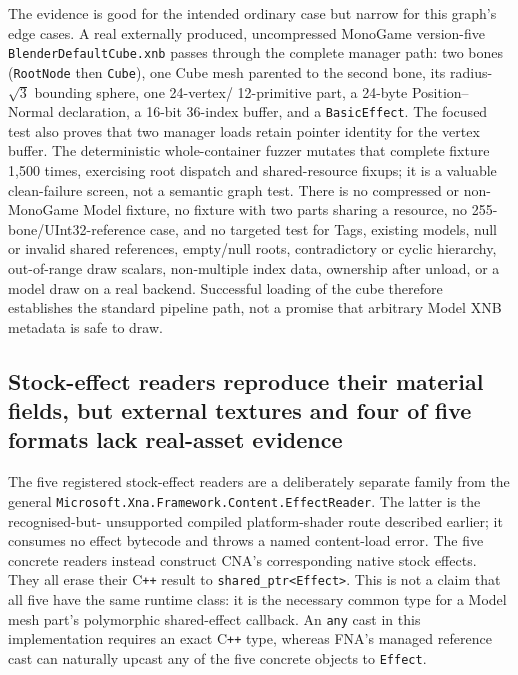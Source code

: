The evidence is good for the intended ordinary case but narrow for this graph's edge cases.  A
real externally produced, uncompressed MonoGame version-five \texttt{BlenderDefaultCube.xnb}
passes through the complete manager path: two bones (\texttt{RootNode} then \texttt{Cube}), one
Cube mesh parented to the second bone, its radius-$\sqrt{3}$ bounding sphere, one 24-vertex/
12-primitive part, a 24-byte Position--Normal declaration, a 16-bit 36-index buffer, and a
\texttt{BasicEffect}.  The focused test also proves that two manager loads retain pointer identity
for the vertex buffer.  The deterministic whole-container fuzzer mutates that complete fixture
1,500 times, exercising root dispatch and shared-resource fixups; it is a valuable clean-failure
screen, not a semantic graph test.  There is no compressed or non-MonoGame Model fixture, no
fixture with two parts sharing a resource, no 255-bone/UInt32-reference case, and no targeted
test for Tags, existing models, null or invalid shared references, empty/null roots, contradictory
or cyclic hierarchy, out-of-range draw scalars, non-multiple index data, ownership after unload,
or a model draw on a real backend.  Successful loading of the cube therefore establishes the
standard pipeline path, not a promise that arbitrary Model XNB metadata is safe to draw.

\subsection{Stock-effect readers reproduce their material fields, but external textures and four of five formats lack real-asset evidence}
\label{sec:xnb-stock-effect-reader-contract}

The five registered stock-effect readers are a deliberately separate family from the general
\texttt{Microsoft.Xna.Framework.Content.EffectReader}.  The latter is the recognised-but-
unsupported compiled platform-shader route described earlier; it consumes no effect bytecode and
throws a named content-load error.  The five concrete readers instead construct CNA's corresponding
native stock effects.  They all erase their C\texttt{++} result to \texttt{shared\_ptr<Effect>}.
This is not a claim that all five have the same runtime
class: it is the necessary common type for a Model mesh part's polymorphic shared-effect callback.
An \texttt{any} cast in this implementation requires an exact C\texttt{++} type, whereas FNA's
managed reference cast can naturally upcast any of the five concrete objects to \texttt{Effect}.

